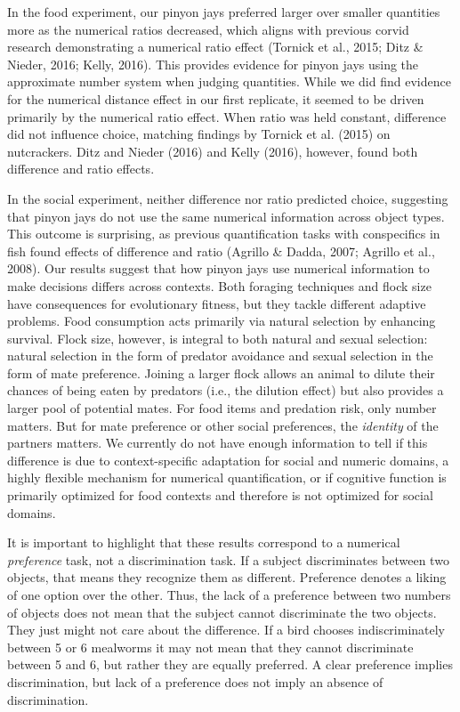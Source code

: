 \documentclass[
  ,pub,floatsintext]{apa6}
\begin{document}
In the food experiment, our pinyon jays preferred larger over smaller quantities more as the numerical ratios decreased, which aligns with previous corvid research demonstrating a numerical ratio effect (Tornick et al., 2015; Ditz \& Nieder, 2016; Kelly, 2016). This provides evidence for pinyon jays using the approximate number system when judging quantities. While we did find evidence for the numerical distance effect in our first replicate, it seemed to be driven primarily by the numerical ratio effect. When ratio was held constant, difference did not influence choice, matching findings by Tornick et al. (2015) on nutcrackers. Ditz and Nieder (2016) and Kelly (2016), however, found both difference and ratio effects.

In the social experiment, neither difference nor ratio predicted choice, suggesting that pinyon jays do not use the same numerical information across object types. This outcome is surprising, as previous quantification tasks with conspecifics in fish found effects of difference and ratio (Agrillo \& Dadda, 2007; Agrillo et al., 2008). Our results suggest that how pinyon jays use numerical information to make decisions differs across contexts. Both foraging techniques and flock size have consequences for evolutionary fitness, but they tackle different adaptive problems. Food consumption acts primarily via natural selection by enhancing survival. Flock size, however, is integral to both natural and sexual selection: natural selection in the form of predator avoidance and sexual selection in the form of mate preference. Joining a larger flock allows an animal to dilute their chances of being eaten by predators (i.e., the dilution effect) but also provides a larger pool of potential mates. For food items and predation risk, only number matters. But for mate preference or other social preferences, the \emph{identity} of the partners matters. We currently do not have enough information to tell if this difference is due to context-specific adaptation for social and numeric domains, a highly flexible mechanism for numerical quantification, or if cognitive function is primarily optimized for food contexts and therefore is not optimized for social domains.

It is important to highlight that these results correspond to a numerical \emph{preference} task, not a discrimination task. If a subject discriminates between two objects, that means they recognize them as different. Preference denotes a liking of one option over the other. Thus, the lack of a preference between two numbers of objects does not mean that the subject cannot discriminate the two objects. They just might not care about the difference. If a bird chooses indiscriminately between 5 or 6 mealworms it may not mean that they cannot discriminate between 5 and 6, but rather they are equally preferred. A clear preference implies discrimination, but lack of a preference does not imply an absence of discrimination.
\end{document}
